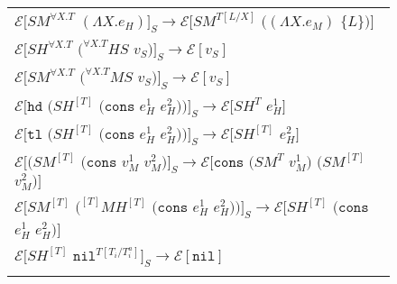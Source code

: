 \begin{figure}[p]
\begin{tabular}{l}
\vspace{5pt}

$\mathscr{E}[SM^{\forall X.T}$ $(\Lambda X.e_{H})]_{S}\rightarrow\mathscr{E}[SM^{T[L/X]}$ $((\Lambda X.e_{M})$ $\lbrace L\rbrace)]$ \\

\vspace{5pt}

$\mathscr{E}[SH^{\forall X.T}$ $(^{\forall X.T}HS$ $v_{S})]_{S}\rightarrow\mathscr{E}[v_{S}]$ \\

\vspace{5pt}

$\mathscr{E}[SM^{\forall X.T}$ $(^{\forall X.T}MS$ $v_{S})]_{S}\rightarrow\mathscr{E}[v_{S}]$ \\

\vspace{5pt}

$\mathscr{E}[\mathtt{hd}$ $(SH^{[T]}$ $(\mathtt{cons}$ $e_{H}^{1}$ $e_{H}^{2}))]_{S}\rightarrow\mathscr{E}[SH^{T}$ $e_{H}^{1}]$ \\

\vspace{5pt}

$\mathscr{E}[\mathtt{tl}$ $(SH^{[T]}$ $(\mathtt{cons}$ $e_{H}^{1}$ $e_{H}^{2}))]_{S}\rightarrow\mathscr{E}[SH^{[T]}$ $e_{H}^{2}]$ \\

\vspace{5pt}

$\mathscr{E}[(SM^{[T]}$ $(\mathtt{cons}$ $v_{M}^{1}$ $v_{M}^{2})]_{S}\rightarrow\mathscr{E}[\mathtt{cons}$ $(SM^{T}$ $v_{M}^{1})$ $(SM^{[T]}$ $v_{M}^{2})]$ \\

\vspace{5pt}

$\mathscr{E}[SM^{[T]}$ $(^{[T]}MH^{[T]}$ $(\mathtt{cons}$ $e_{H}^{1}$ $e_{H}^{2}))]_{S}\rightarrow\mathscr{E}[SH^{[T]}$ $(\mathtt{cons}$ $e_{H}^{1}$ $e_{H}^{2})]$ \\

\vspace{5pt}

$\mathscr{E}[SH^{[T]}$ $\mathtt{nil}^{T[T_{i}/T_{i}^{a}]}]_{S}\rightarrow\mathscr{E}[\mathtt{nil}]$ \\

\vspace{5pt}


\end{tabular}
\end{figure}
